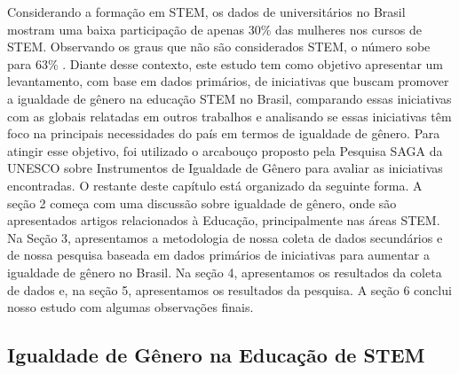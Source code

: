 Considerando a formação em STEM, os dados de universitários no Brasil mostram uma baixa participação de apenas 30\% das mulheres nos cursos de STEM. Observando os graus que não são considerados STEM, o número sobe para 63\% \citep{noauthor_igualdade_nodate}. Diante desse contexto, este estudo tem como objetivo apresentar um levantamento, com base em dados primários, de iniciativas que buscam promover a igualdade de gênero na educação STEM no Brasil, comparando essas iniciativas com as globais relatadas em outros trabalhos e analisando se essas iniciativas têm foco na principais necessidades do país em termos de igualdade de gênero. Para atingir esse objetivo, foi utilizado o arcabouço proposto pela Pesquisa SAGA da UNESCO sobre Instrumentos de Igualdade de Gênero para avaliar as iniciativas encontradas. O restante deste capítulo está organizado da seguinte forma. A seção 2 começa com uma discussão sobre igualdade de gênero, onde são apresentados artigos relacionados à Educação, principalmente nas áreas STEM. Na Seção 3, apresentamos a metodologia de nossa coleta de dados secundários e de nossa pesquisa baseada em dados primários de iniciativas para aumentar a igualdade de gênero no Brasil. Na seção 4, apresentamos os resultados da coleta de dados e, na seção 5, apresentamos os resultados da pesquisa. A seção 6 conclui nosso estudo com algumas observações finais.

\subsection{Igualdade de Gênero na Educação de STEM}

